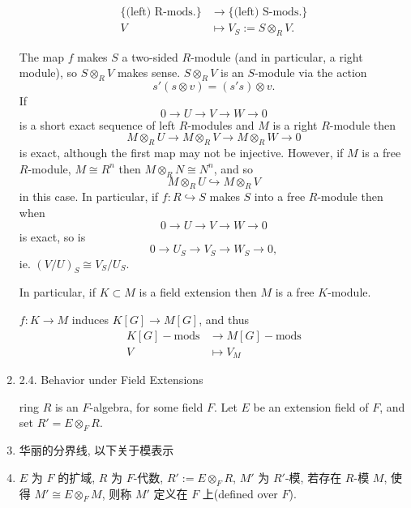 \documentclass{ctexart}
\begin{document}
\begin{enumerate}
\begin{align*}
\{\text{(left) R-mods.}\} &\to \{\text{(left) S-mods.}\}\\
V &\mapsto V_S := S \otimes_R V.
\end{align*}

The map $f$ makes $S$ a two-sided $R$-module (and in particular, a right module), so $S \otimes_R V$ makes sense. $S \otimes_R V$ is an $S$-module via the action
\[
s'(s \otimes v) = (s's)\otimes v.
\]
If
\[
0 \to U \to V \to W \to 0
\]
is a short exact sequence of left $R$-modules and $M$ is a right $R$-module then
\[
M\otimes_R U \to M\otimes_R V \to M\otimes_R W \to 0
\]
is exact, although the first map may not be injective. However, if $M$ is a free $R$-module, $M \cong R^n$ then $M\otimes_R N \cong N^n$, and so
\[
M\otimes_R U \hookrightarrow M\otimes_R V
\]
in this case.
\qquad In particular, if $f : R \hookrightarrow S$ makes $S$ into a free $R$-module then when
\[
0 \to U \to V \to W \to 0
\]
is exact, so is
\[
0\to U_S\to V_S\to W_S\to  0,
\]
ie. $(V/U)_S \cong V_S/U_S$.

\qquad In particular, if $K \subset M$ is a field extension then $M$ is a free $K$-module.

\qquad $f : K \to M$ induces $K[G]\to M[G]$, and thus
\begin{align*}
K[G]\!\!-\!\!\mathrm{mods} &\to M[G]\!\!-\!\!\mathrm{mods}\\
V &\mapsto V_M
\end{align*}

\item 2.4. Behavior under Field Extensions\cite{weintraub2003representation}

ring $R$ is an $F$-algebra, for some field $F$. Let $E$ be an extension field of $F$, and set $R' = E\otimes_F R$.


\item 华丽的分界线, 以下关于模表示

\item $E$ 为 $F$ 的扩域, $R$ 为 $F$-代数, $R':=E\otimes_{F} R$, $M'$ 为 $R'$-模, 若存在 $R$-模 $M$, 使得 $M' \cong E\otimes_{F} M$, 则称 $M'$ 定义在 $F$ 上(defined over $F$).
\end{enumerate}
\printbibliography
\end{document}
